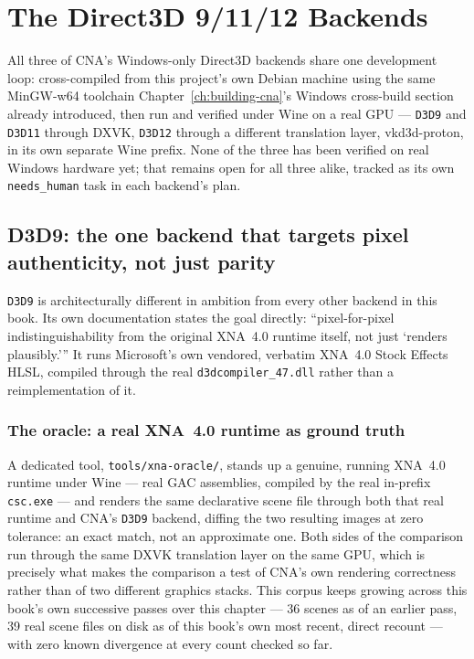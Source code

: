 \chapter{The Direct3D 9/11/12 Backends}
\label{ch:direct3d-backends}

All three of CNA's Windows-only Direct3D backends share one development loop:
cross-compiled from this project's own Debian machine using the same MinGW-w64 toolchain
Chapter~\ref{ch:building-cna}'s Windows cross-build section already introduced, then run and
verified under Wine on a real GPU --- \texttt{D3D9} and \texttt{D3D11} through DXVK,
\texttt{D3D12} through a different translation layer, vkd3d-proton, in its own separate Wine
prefix. None of the three has been verified on real Windows hardware yet; that remains open
for all three alike, tracked as its own \texttt{needs\_human} task in each backend's plan.

\section{D3D9: the one backend that targets pixel authenticity, not just parity}

\texttt{D3D9} is architecturally different in ambition from every other backend in this book.
Its own documentation states the goal directly: ``pixel-for-pixel indistinguishability from
the original XNA~4.0 runtime itself, not just `renders plausibly.''' It runs Microsoft's own
vendored, verbatim XNA~4.0 Stock Effects HLSL, compiled through the real
\texttt{d3dcompiler\_47.dll} rather than a reimplementation of it.

\subsection{The oracle: a real XNA~4.0 runtime as ground truth}

A dedicated tool, \texttt{tools/xna-oracle/}, stands up a genuine, running XNA~4.0 runtime
under Wine --- real GAC assemblies, compiled by the real in-prefix \texttt{csc.exe} --- and
renders the same declarative scene file through both that real runtime and CNA's \texttt{D3D9}
backend, diffing the two resulting images at zero tolerance: an exact match, not an
approximate one. Both sides of the comparison run through the same DXVK translation layer on
the same GPU, which is precisely what makes the comparison a test of CNA's own rendering
correctness rather than of two different graphics stacks. This corpus keeps growing across
this book's own successive passes over this chapter --- 36 scenes as of an earlier pass, 39
real scene files on disk as of this book's own most recent, direct recount --- with zero known
divergence at every count checked so far.

